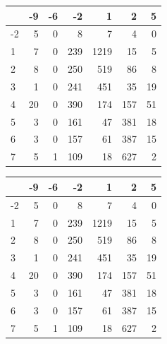 \documentclass[]{book}
\newenvironment{Shaded}{\begin{snugshade}}{\end{snugshade}}
\newcommand{\CommentTok}[1]{\textcolor[rgb]{0.56,0.35,0.01}{\textit{#1}}}
\newcommand{\DataTypeTok}[1]{\textcolor[rgb]{0.13,0.29,0.53}{#1}}
\newcommand{\KeywordTok}[1]{\textcolor[rgb]{0.13,0.29,0.53}{\textbf{#1}}}
\newcommand{\NormalTok}[1]{#1}
\newcommand{\OperatorTok}[1]{\textcolor[rgb]{0.81,0.36,0.00}{\textbf{#1}}}
\newcommand{\StringTok}[1]{\textcolor[rgb]{0.31,0.60,0.02}{#1}}
\begin{document}
\begin{Shaded}
\end{Shaded}

\begin{tabular}{l|r|r|r|r|r|r}
\hline
  & -9 & -6 & -2 & 1 & 2 & 5\\
\hline
-2 & 5 & 0 & 8 & 7 & 4 & 0\\
\hline
1 & 7 & 0 & 239 & 1219 & 15 & 5\\
\hline
2 & 8 & 0 & 250 & 519 & 86 & 8\\
\hline
3 & 1 & 0 & 241 & 451 & 35 & 19\\
\hline
4 & 20 & 0 & 390 & 174 & 157 & 51\\
\hline
5 & 3 & 0 & 161 & 47 & 381 & 18\\
\hline
6 & 3 & 0 & 157 & 61 & 387 & 15\\
\hline
7 & 5 & 1 & 109 & 18 & 627 & 2\\
\hline
\end{tabular}

\begin{Shaded}
\end{Shaded}

\begin{tabular}{l|r|r|r|r|r|r}
\hline
  & -9 & -6 & -2 & 1 & 2 & 5\\
\hline
-2 & 5 & 0 & 8 & 7 & 4 & 0\\
\hline
1 & 7 & 0 & 239 & 1219 & 15 & 5\\
\hline
2 & 8 & 0 & 250 & 519 & 86 & 8\\
\hline
3 & 1 & 0 & 241 & 451 & 35 & 19\\
\hline
4 & 20 & 0 & 390 & 174 & 157 & 51\\
\hline
5 & 3 & 0 & 161 & 47 & 381 & 18\\
\hline
6 & 3 & 0 & 157 & 61 & 387 & 15\\
\hline
7 & 5 & 1 & 109 & 18 & 627 & 2\\
\hline
\end{tabular}
\end{document}
